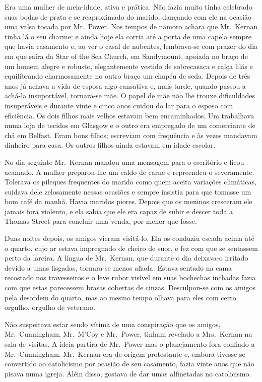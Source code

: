 Era uma mulher de meia-idade, ativa e prática.  Não fazia muito tinha celebrado
suas bodas de prata e se reaproximado do marido, dançando com ele na ocasião
uma valsa tocada por Mr.~Power.  Nos tempos de namoro achara que Mr.~Kernan
tinha lá o seu charme: e ainda hoje ela corria até a porta de uma capela sempre
que havia casamento e, ao ver o casal de nubentes, lembrava-se com prazer do
dia em que saíra da Star of the Sea Church, em Sandymount, apoiada no braço de
um homem alegre e robusto, elegantemente vestido de sobrecasaca e calça lilás e
equilibrando charmosamente no outro braço um chapéu de seda.  Depois de três
anos já achava a vida de esposa algo cansativa e, mais tarde, quando passou a
achá-la insuportável, tornara-se mãe.  O papel de mãe não lhe trouxe
dificuldades insuperáveis e durante vinte e cinco anos cuidou do lar para o
esposo com eficiência.  Os dois filhos mais velhos estavam bem encaminhados.
Um trabalhava numa loja de tecidos em Glasgow e o outro era empregado de um
comerciante de chá em Belfast.  Eram bons filhos; escreviam com frequência e às
vezes mandavam dinheiro para casa.  Os outros filhos ainda estavam em idade
escolar.

No dia seguinte Mr.~Kernan mandou uma mensagem para o escritório e ficou
acamado.  A mulher preparou-lhe um caldo de carne e repreendeu-o severamente.
Tolerava os pileques frequentes do marido como quem aceita variações
climáticas, cuidava dele zelosamente nessas ocasiões e sempre insistia para que
tomasse um bom café da manhã.  Havia maridos piores.  Depois que os meninos
cresceram ele jamais fora violento, e ela sabia que ele era capaz de subir e
descer toda a Thomas Street para concluir uma venda, por menor que fosse.

Duas noites depois, os amigos vieram visitá-lo.  Ela os conduziu escada acima
até o quarto, cujo ar estava impregnado de cheiro de suor, e fez com que se
sentassem perto da lareira.  A língua de Mr.~Kernan, que durante o dia
deixava-o irritado devido a umas fisgadas, tornara-se menos afiada.  Estava
sentado na cama recostado nos travesseiros e o leve rubor visível em suas
bochechas inchadas fazia com que estas parecessem brasas cobertas de cinzas.
Desculpou-se com os amigos pela desordem do quarto, mas ao mesmo tempo olhava
para eles com certo orgulho, orgulho de veterano.

Não suspeitava estar sendo vítima de uma conspiração que os amigos, 
Mr.~Cunningham, Mr.~M’Coy e Mr.~Power, tinham revelado a Mrs.~Kernan na sala de
visitas.  A ideia partira de Mr.~Power mas o planejamento fora confiado a 
Mr.~Cunningham.  Mr.~Kernan era de origem protestante e, embora tivesse se
convertido ao catolicismo por ocasião de seu casamento, fazia vinte anos que
não pisava numa igreja.  Além disso, gostava de dar umas alfinetadas no
catolicismo.

